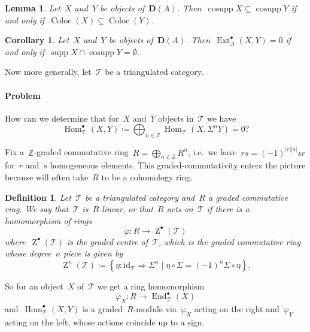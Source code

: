 \documentclass[10pt,a4paper]{article}
\theoremstyle{lecture}
\newtheorem{corollary}[theorem]{Corollary}
\newtheorem{definition}[theorem]{Definition}
\newtheorem{lemma}[theorem]{Lemma}
\newcommand\dash{\nobreakdash-\hspace{0pt}}
\newcommand\derived{\ensuremath{\mathbf{D}}}
\newcommand\identity{\ensuremath{\mathrm{id}}}
\DeclareMathOperator\centre{Z}
\DeclareMathOperator\Coloc{Coloc}
\DeclareMathOperator\cosupp{cosupp}
\DeclareMathOperator\End{End}
\DeclareMathOperator\Ext{Ext}
\DeclareMathOperator\Hom{Hom}
\DeclareMathOperator\supp{supp}
\begin{document}
\begin{lemma}
  Let~$X$ and~$Y$ be objects of~$\derived(A)$. Then~$\cosupp X\subseteq \cosupp Y$ if and only if~$\Coloc(X)\subseteq\Coloc(Y)$.
\end{lemma}

\begin{corollary}
  Let~$X$ and~$Y$ be objects of~$\derived(A)$. Then~$\Ext_A^\bullet(X,Y)=0$ if and only if~$\supp X\cap\cosupp Y=\emptyset$.
\end{corollary}

Now more generally, let~$\mathcal{T}$ be a triangulated category.
\paragraph{Problem} How can we determine that for~$X$ and~$Y$ objects in~$\mathcal{T}$ we have
\begin{equation}
  \Hom_{\mathcal{T}}^\bullet(X,Y)\coloneqq\bigoplus_{n\in\mathbb{Z}}\Hom_{\mathcal{T}}(X,\Sigma^nY)=0?
\end{equation}

Fix a~$\mathbb{Z}$\dash graded commutative ring~$R=\bigoplus_{n\in\mathbb{Z}}R^n$, i.e.\ we have~$rs=(-1)^{|r||s|}sr$ for~$r$ and~$s$ homogeneous elements. This graded-commutativity enters the picture because will often take~$R$ to be a cohomology ring.
\begin{definition}
  Let~$\mathcal{T}$ be a triangulated category and~$R$ a graded commutative ring. We say that~$\mathcal{T}$ is~\emph{$R$\dash linear}, or that~\emph{$R$ acts on~$\mathcal{T}$} if there is a homomorphism of rings
  \begin{equation}
    \varphi\colon R\to\centre^\bullet(\mathcal{T})
  \end{equation}
  where~$\centre^\bullet(\mathcal{T})$ is the \emph{graded centre} of~$\mathcal{T}$, which is the graded commutative ring whose degree~$n$ piece is given by
  \begin{equation}
    \centre^n(\mathcal{T})\coloneqq\left\{ \eta\colon\identity_{\mathcal{T}}\Rightarrow\Sigma^n\mid\eta\circ\Sigma=(-1)^n\Sigma\circ\eta \right\}.
  \end{equation}
\end{definition}
So for an object~$X$ of~$\mathcal{T}$ we get a ring homomorphism
\begin{equation}
  \varphi_X\colon R\to\End_{\mathcal{T}}^\bullet(X)
\end{equation}
and~$\Hom_{\mathcal{T}}^\bullet(X,Y)$ is a graded~$R$\dash module via~$\varphi_X$ acting on the right and~$\varphi_Y$ acting on the left, whose actions coincide up to a sign.
\end{document}
